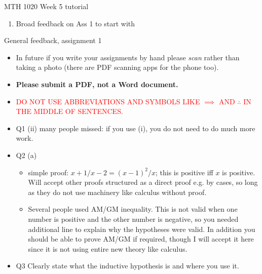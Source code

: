 \documentclass[aspectratio=169]{beamer}
\begin{document}
\begin{frame}{MTH 1020 Week 5 tutorial}
\begin{enumerate}
  \item Broad feedback on Ass 1 to start with
\end{enumerate}
\end{frame}
\begin{frame}{General feedback, assignment 1}
\begin{itemize}
  \item In future if you write your assignments by hand please \emph{scan} rather than taking a photo (there are PDF scanning apps for the phone too).\
  \item \textbf{Please submit a PDF, not a Word document.}
  \item \textcolor{red}{DO NOT USE ABBREVIATIONS AND SYMBOLS LIKE $ \implies $ AND $ \therefore $ IN THE MIDDLE OF SENTENCES.}
  \item Q1 (ii) many people missed: if you use (i), you do not need to do much more work.
  \item Q2 (a)
    \begin{itemize}
      \item simple proof: $ x + 1/x - 2 = (x - 1)^2/x $; this is positive iff $ x $ is positive. Will accept other proofs structured as a direct proof e.g. by cases,
            so long as they do not use machinery like calculus without proof.
      \item Several people used AM/GM inequality. This is not valid when one number is positive and the other number is negative, so you needed additional line to explain why the hypotheses were valid.
            In addition you should be able to prove AM/GM if required, though I will accept it here since it is not using entire new theory like calculus.
    \end{itemize}
  \item Q3 Clearly state what the inductive hypothesis is and where you use it.
\end{itemize}
\end{frame}
\end{document}
